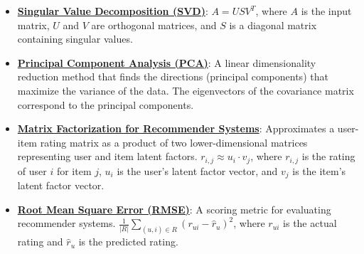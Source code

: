 \documentclass{article}%
\begin{document}
\begin{itemize}[leftmargin=*]%
\item \href{https://purdue.brightspace.com/d2l/common/assets/pdfjs-d2l-dist/1.0.14-legacy/web/viewer.html?file=\%2Fcontent\%2Fenforced\%2F1095467-wl.202510.CS.24300.001\%2F11L2-svd-pca-recommender.pdf\%3Fou\%3D1095467\&lang=en-us\&container=d2l-fileviewer-rendered-pdf\&fullscreen=d2l-fileviewer-rendered-pdf-dialog\&height=667#page=10}{\textbf{Singular Value Decomposition (SVD)}}: $A = USV^T$, where $A$ is the input matrix, $U$ and $V$ are orthogonal matrices, and $S$ is a diagonal matrix containing singular values.%
\item \href{https://purdue.brightspace.com/d2l/common/assets/pdfjs-d2l-dist/1.0.14-legacy/web/viewer.html?file=\%2Fcontent\%2Fenforced\%2F1095467-wl.202510.CS.24300.001\%2F11L2-svd-pca-recommender.pdf\%3Fou\%3D1095467\&lang=en-us\&container=d2l-fileviewer-rendered-pdf\&fullscreen=d2l-fileviewer-rendered-pdf-dialog\&height=667#page=17}{\textbf{Principal Component Analysis (PCA)}}: A linear dimensionality reduction method that finds the directions (principal components) that maximize the variance of the data. The eigenvectors of the covariance matrix correspond to the principal components.%
\item \href{https://purdue.brightspace.com/d2l/common/assets/pdfjs-d2l-dist/1.0.14-legacy/web/viewer.html?file=\%2Fcontent\%2Fenforced\%2F1095467-wl.202510.CS.24300.001\%2F11L2-svd-pca-recommender.pdf\%3Fou\%3D1095467\&lang=en-us\&container=d2l-fileviewer-rendered-pdf\&fullscreen=d2l-fileviewer-rendered-pdf-dialog\&height=667#page=36}{\textbf{Matrix Factorization for Recommender Systems}}: Approximates a user-item rating matrix as a product of two lower-dimensional matrices representing user and item latent factors. $r_{i,j} \approx u_i \cdot v_j$, where $r_{i,j}$ is the rating of user $i$ for item $j$, $u_i$ is the user's latent factor vector, and $v_j$ is the item's latent factor vector.%
\item \href{https://purdue.brightspace.com/d2l/common/assets/pdfjs-d2l-dist/1.0.14-legacy/web/viewer.html?file=\%2Fcontent\%2Fenforced\%2F1095467-wl.202510.CS.24300.001\%2F11L2-svd-pca-recommender.pdf\%3Fou\%3D1095467\&lang=en-us\&container=d2l-fileviewer-rendered-pdf\&fullscreen=d2l-fileviewer-rendered-pdf-dialog\&height=667#page=49}{\textbf{Root Mean Square Error (RMSE)}}: A scoring metric for evaluating recommender systems. $\frac{1}{|R|} \sum_{(u,i) \in R} (r_{ui} - \hat{r}_u)^2$, where $r_{ui}$ is the actual rating and $\hat{r}_u$ is the predicted rating.%
\end{itemize}%
\end{document}
